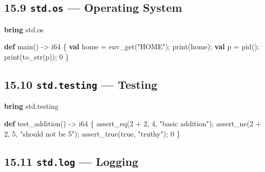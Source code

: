 \documentclass[
  english,
]{book}
\newenvironment{Shaded}{\begin{snugshade}}{\end{snugshade}}
\newcommand{\ConstantTok}[1]{\textcolor[rgb]{0.31,0.76,1.00}{#1}}
\newcommand{\DataTypeTok}[1]{\textcolor[rgb]{0.31,0.79,0.69}{#1}}
\newcommand{\DecValTok}[1]{\textcolor[rgb]{0.71,0.81,0.66}{#1}}
\newcommand{\FunctionTok}[1]{\textcolor[rgb]{0.86,0.86,0.67}{#1}}
\newcommand{\KeywordTok}[1]{\textcolor[rgb]{0.34,0.61,0.84}{\textbf{#1}}}
\newcommand{\NormalTok}[1]{\textcolor[rgb]{0.83,0.83,0.83}{#1}}
\newcommand{\OperatorTok}[1]{\textcolor[rgb]{0.83,0.83,0.83}{#1}}
\newcommand{\StringTok}[1]{\textcolor[rgb]{0.81,0.57,0.47}{#1}}
\begin{document}
\subsection{\texorpdfstring{15.9 \texttt{std.os} --- Operating
System}{15.9 std.os --- Operating System}}\label{std.os-operating-system}

\begin{Shaded}
\begin{Highlighting}[]
\KeywordTok{bring}\NormalTok{ std}\OperatorTok{.}\NormalTok{os}

\KeywordTok{def}\NormalTok{ main() }\OperatorTok{{-}\textgreater{}} \DataTypeTok{i64}\NormalTok{ \{}
    \KeywordTok{val}\NormalTok{ home }\OperatorTok{=} \FunctionTok{env\_get}\NormalTok{(}\StringTok{"HOME"}\NormalTok{);}
    \FunctionTok{print}\NormalTok{(home);}
    \KeywordTok{val}\NormalTok{ p }\OperatorTok{=} \FunctionTok{pid}\NormalTok{();}
    \FunctionTok{print}\NormalTok{(}\FunctionTok{to\_str}\NormalTok{(p));}
    \DecValTok{0}
\NormalTok{\}}
\end{Highlighting}
\end{Shaded}

\subsection{\texorpdfstring{15.10 \texttt{std.testing} ---
Testing}{15.10 std.testing --- Testing}}\label{std.testing-testing}

\begin{Shaded}
\begin{Highlighting}[]
\KeywordTok{bring}\NormalTok{ std}\OperatorTok{.}\NormalTok{testing}

\KeywordTok{def}\NormalTok{ test\_addition() }\OperatorTok{{-}\textgreater{}} \DataTypeTok{i64}\NormalTok{ \{}
\NormalTok{    assert\_eq(}\DecValTok{2} \OperatorTok{+} \DecValTok{2}\NormalTok{, }\DecValTok{4}\NormalTok{, }\StringTok{"basic addition"}\NormalTok{);}
\NormalTok{    assert\_ne(}\DecValTok{2} \OperatorTok{+} \DecValTok{2}\NormalTok{, }\DecValTok{5}\NormalTok{, }\StringTok{"should not be 5"}\NormalTok{);}
\NormalTok{    assert\_true(}\ConstantTok{true}\NormalTok{, }\StringTok{"truthy"}\NormalTok{);}
    \DecValTok{0}
\NormalTok{\}}
\end{Highlighting}
\end{Shaded}

\subsection{\texorpdfstring{15.11 \texttt{std.log} ---
Logging}{15.11 std.log --- Logging}}\label{std.log-logging}
\end{document}
